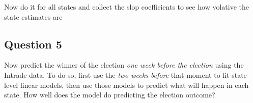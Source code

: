 \documentclass[]{article}
\begin{document}
Now do it for all states and collect the slop coefficients to see how
volative the state estimates are

\subsection{Question 5}\label{question-5}

Now predict the winner of the election \emph{one week before the
election} using the Intrade data. To do so, first use the \emph{two
weeks before} that moment to fit state level linear models, then use
those models to predict what will happen in each state. How well does
the model do predicting the election outcome?
\end{document}
